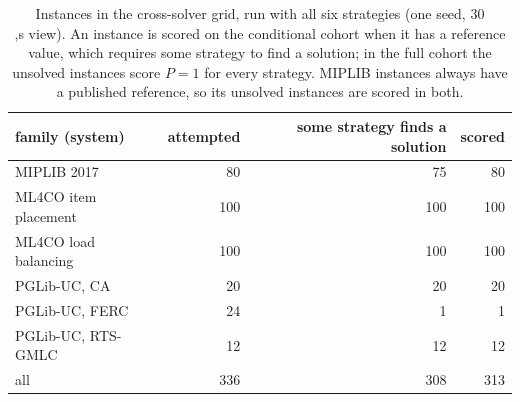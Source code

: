 \begin{table}[h]\centering\small
\begin{tabular}{lrrr}
\toprule
family (system) & attempted & some strategy finds a solution & scored \\
\midrule
MIPLIB 2017 & 80 & 75 & 80 \\
ML4CO item placement & 100 & 100 & 100 \\
ML4CO load balancing & 100 & 100 & 100 \\
PGLib-UC, CA & 20 & 20 & 20 \\
PGLib-UC, FERC & 24 & 1 & 1 \\
PGLib-UC, RTS-GMLC & 12 & 12 & 12 \\
\midrule
all & 336 & 308 & 313 \\
\bottomrule
\end{tabular}
\caption{Instances in the cross-solver grid, run with all six strategies (one seed, 30\\,s view). An instance is scored on the conditional cohort when it has a reference value, which requires some strategy to find a solution; in the full cohort the unsolved instances score $P=1$ for every strategy. MIPLIB instances always have a published reference, so its unsolved instances are scored in both.}\label{tab:flow}
\end{table}
